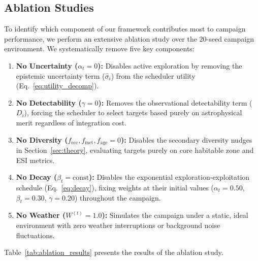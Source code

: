 \documentclass[11pt,a4paper]{article}
\begin{document}
\subsection{Ablation Studies}
\label{sec:ablation}

To identify which component of our framework contributes most to campaign performance, we perform an extensive ablation study over the 20-seed campaign environment. We systematically remove five key components:
\begin{enumerate}
    \item \textbf{No Uncertainty ($\alpha_t = 0$):} Disables active exploration by removing the epistemic uncertainty term ($\hat{\sigma}_i$) from the scheduler utility (Eq.~\ref{eq:utility_decomp}).
    \item \textbf{No Detectability ($\gamma = 0$):} Removes the observational detectability term ($D_i$), forcing the scheduler to select targets based purely on astrophysical merit regardless of integration cost.
    \item \textbf{No Diversity ($f_{\text{ecc}}, f_{\text{met}}, f_{\text{age}} = 0$):} Disables the secondary diversity nudges in Section~\ref{sec:theory}, evaluating targets purely on core habitable zone and ESI metrics.
    \item \textbf{No Decay ($\beta_t = \text{const}$):} Disables the exponential exploration-exploitation schedule (Eq.~\ref{eq:decay}), fixing weights at their initial values ($\alpha_t = 0.50$, $\beta_t = 0.30$, $\gamma = 0.20$) throughout the campaign.
    \item \textbf{No Weather ($W^{(t)} = 1.0$):} Simulates the campaign under a static, ideal environment with zero weather interruptions or background noise fluctuations.
\end{enumerate}

Table~\ref{tab:ablation_results} presents the results of the ablation study.
\end{document}
